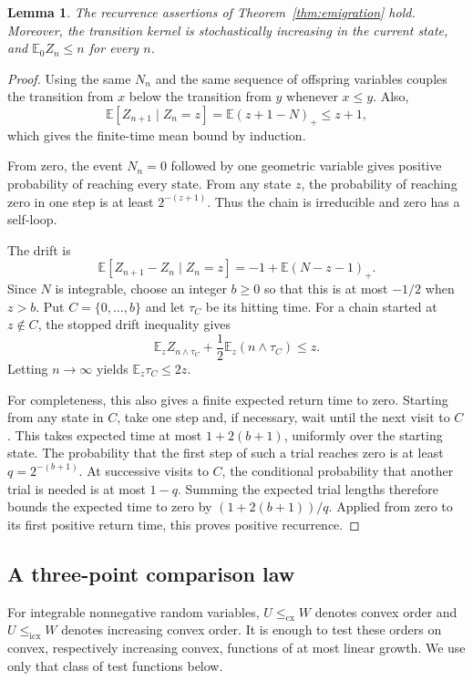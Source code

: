 \documentclass[11pt]{amsart}
\numberwithin{equation}{section}
\newtheorem{lemma}[theorem]{Lemma}
\theoremstyle{remark}
\newcommand{\E}{\mathbb E}
\newcommand{\cx}{\le_{\mathrm{cx}}}
\newcommand{\icx}{\le_{\mathrm{icx}}}
\begin{document}
\begin{lemma}\label{lem:recurrence}
The recurrence assertions of Theorem~\ref{thm:emigration} hold. Moreover, the transition kernel is stochastically increasing in the current state, and $\E_0Z_n\le n$ for every $n$.
\end{lemma}

\begin{proof}
Using the same $N_n$ and the same sequence of offspring variables couples the transition from $x$ below the transition from $y$ whenever $x\le y$. Also,
\[
 \E[Z_{n+1}\mid Z_n=z]=\E(z+1-N)_+\le z+1,
\]
which gives the finite-time mean bound by induction.

From zero, the event $N_n=0$ followed by one geometric variable gives positive probability of reaching every state. From any state $z$, the probability of reaching zero in one step is at least $2^{-(z+1)}$. Thus the chain is irreducible and zero has a self-loop.

The drift is
\begin{equation}\label{eq:drift}
 \E[Z_{n+1}-Z_n\mid Z_n=z]
 =-1+\E(N-z-1)_+.
\end{equation}
Since $N$ is integrable, choose an integer $b\ge0$ so that this is at most $-1/2$ when $z>b$. Put $C=\{0,\ldots,b\}$ and let $\tau_C$ be its hitting time. For a chain started at $z\notin C$, the stopped drift inequality gives
\[
 \E_z Z_{n\wedge\tau_C}+\frac12\E_z(n\wedge\tau_C)\le z.
\]
Letting $n\to\infty$ yields $\E_z\tau_C\le2z$.

For completeness, this also gives a finite expected return time to zero. Starting from any state in $C$, take one step and, if necessary, wait until the next visit to $C$. This takes expected time at most $1+2(b+1)$, uniformly over the starting state. The probability that the first step of such a trial reaches zero is at least $q=2^{-(b+1)}$. At successive visits to $C$, the conditional probability that another trial is needed is at most $1-q$. Summing the expected trial lengths therefore bounds the expected time to zero by $(1+2(b+1))/q$. Applied from zero to its first positive return time, this proves positive recurrence.
\end{proof}

\subsection{A three-point comparison law}

For integrable nonnegative random variables, $U\cx W$ denotes convex order and $U\icx W$ denotes increasing convex order. It is enough to test these orders on convex, respectively increasing convex, functions of at most linear growth. We use only that class of test functions below.
\end{document}
